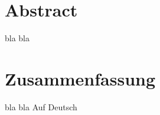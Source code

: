 %
%
\thispagestyle{empty}
%
\vspace*{1cm}
\section*{Abstract}

bla bla

\vspace*{2.2cm}
\section*{Zusammenfassung}

bla bla Auf Deutsch

%
